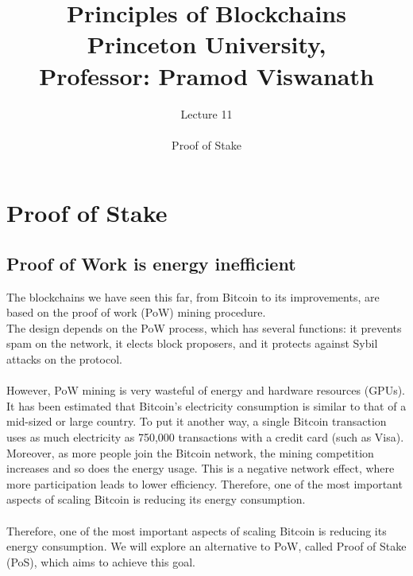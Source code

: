 \documentclass{report}
\title{\Huge{Principles of Blockchains \\ Princeton University,\\
		Professor: Pramod Viswanath}}
\author{\huge{Lecture 11} \\\\ Proof of Stake}
\begin{document}
\maketitle
\newpage%
\tableofcontents
\pagebreak

\chapter{Proof of Stake}
\section{Proof of Work is energy inefficient}
The blockchains we have seen this far, from Bitcoin to its improvements, are based on the proof of work (PoW) mining procedure.\\
The design depends on the PoW process, which has several functions: it prevents spam on the network, it elects block proposers, and it protects against Sybil attacks on the protocol.\\\\
However, PoW mining is very wasteful of energy and hardware resources (GPUs). It has been estimated that Bitcoin’s electricity consumption is similar to that of a mid-sized or large country. To put it another way, a single Bitcoin transaction uses as much electricity as 750,000 transactions with a credit card (such as Visa).\\
Moreover, as more people join the Bitcoin network, the mining competition increases and so does the energy usage.
This is a negative network effect, where more participation leads to lower efficiency. Therefore, one of the most important aspects of scaling Bitcoin is reducing its energy consumption.\\\\
Therefore, one of the most important aspects of scaling Bitcoin is reducing its energy consumption. We will explore an alternative to PoW, called Proof of Stake (PoS), which aims to achieve this goal.
\end{document}
